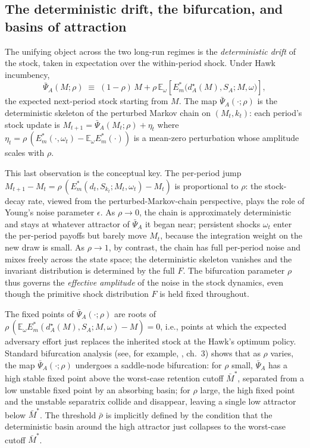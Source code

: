 \documentclass[11pt,twoside]{extarticle}
\begin{document}
\subsection{The deterministic drift, the bifurcation, and basins of attraction}\label{sec:drift_v2}

The unifying object across the two long-run regimes is the \emph{deterministic drift} of the stock, taken in expectation over the within-period shock. Under Hawk incumbency,
\begin{equation}\label{eq:drift_v2}
    \bar\Psi_A(M;\rho)\;\equiv\;(1-\rho)\,M+\rho\,\mathbb{E}_\omega\!\left[E_m^*\big(d_A^\star(M),S_A;M,\omega\big)\right],
\end{equation}
the expected next-period stock starting from $M$. The map $\bar\Psi_A(\cdot;\rho)$ is the deterministic skeleton of the perturbed Markov chain on $(M_t,k_t)$: each period's stock update is $M_{t+1}=\bar\Psi_A(M_t;\rho)+\eta_t$ where $\eta_t=\rho\,(E_m^*(\cdot,\omega_t)-\mathbb{E}_\omega E_m^*(\cdot))$ is a mean-zero perturbation whose amplitude scales with $\rho$.

This last observation is the conceptual key. The per-period jump $M_{t+1}-M_t=\rho\,(E_m^*(d_t,S_{k_t};M_t,\omega_t)-M_t)$ is proportional to $\rho$: the stock-decay rate, viewed from the perturbed-Markov-chain perspective, plays the role of Young's noise parameter $\epsilon$. As $\rho\to 0$, the chain is approximately deterministic and stays at whatever attractor of $\bar\Psi_A$ it began near; persistent shocks $\omega_t$ enter the per-period payoffs but barely move $M_t$, because the integration weight on the new draw is small. As $\rho\to 1$, by contrast, the chain has full per-period noise and mixes freely across the state space; the deterministic skeleton vanishes and the invariant distribution is determined by the full $F$. The bifurcation parameter $\rho$ thus governs the \emph{effective amplitude} of the noise in the stock dynamics, even though the primitive shock distribution $F$ is held fixed throughout.

The fixed points of $\bar\Psi_A(\cdot;\rho)$ are roots of $\rho\,(\mathbb{E}_\omega E_m^*(d_A^\star(M),S_A;M,\omega)-M)=0$, i.e., points at which the expected adversary effort just replaces the inherited stock at the Hawk's optimum policy. Standard bifurcation analysis (see, for example, \citealp{youngIndividualStrategySocial2020}, ch.~3) shows that as $\rho$ varies, the map $\bar\Psi_A(\cdot;\rho)$ undergoes a saddle-node bifurcation: for $\rho$ small, $\bar\Psi_A$ has a high stable fixed point above the worst-case retention cutoff $\bar M^*$, separated from a low unstable fixed point by an absorbing basin; for $\rho$ large, the high fixed point and the unstable separatrix collide and disappear, leaving a single low attractor below $\bar M^*$. The threshold $\bar\rho$ is implicitly defined by the condition that the deterministic basin around the high attractor just collapses to the worst-case cutoff $\bar M^*$.
\end{document}
